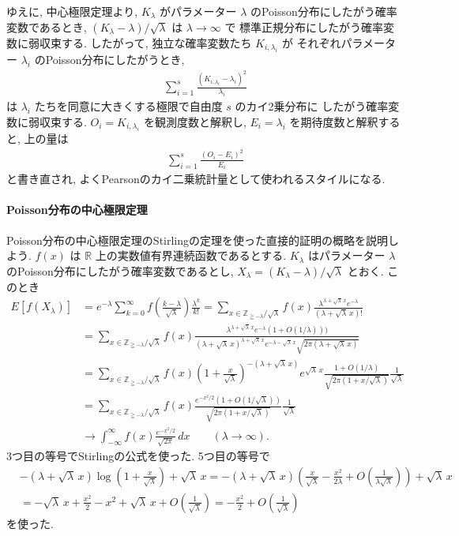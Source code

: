 \documentclass[12pt,twoside]{jarticle}
\newcommand\Z{{\mathbb Z}} %
\newcommand\R{{\mathbb R}} %
\theoremstyle{jplain}
\theoremstyle{jplain}
\theoremstyle{jplain}
\numberwithin{theorem}{section}
\numberwithin{equation}{section}
\numberwithin{figure}{section}
\numberwithin{table}{section}
\begin{document}
ゆえに, 中心極限定理より,
$K_\lambda$ がパラメーター $\lambda$ のPoisson分布にしたがう確率変数であるとき, $(K_\lambda-\lambda)/\sqrt{\lambda}$ は $\lambda\to\infty$ で
標準正規分布にしたがう確率変数に弱収束する.
したがって, 独立な確率変数たち $K_{i,\lambda_i}$ が
それぞれパラメーター $\lambda_i$ のPoisson分布にしたがうとき,
\begin{align*}
\sum_{i=1}^s \frac{(K_{i,\lambda_i}-\lambda_i)^2}{\lambda_i}
\end{align*}
は $\lambda_i$ たちを同意に大きくする極限で自由度 $s$ のカイ2乗分布に
したがう確率変数に弱収束する. $O_i=K_{i,\lambda_i}$ を観測度数と解釈し,
$E_i=\lambda_i$ を期待度数と解釈すると, 上の量は
\begin{align*}
\sum_{i=1}^s \frac{(O_i-E_i)^2}{E_i}
\end{align*}
と書き直され, よくPearsonのカイ二乗統計量として使われるスタイルになる.


\paragraph{Poisson分布の中心極限定理}
Poisson分布の中心極限定理のStirlingの定理を使った直接的証明の概略を説明しよう.
$f(x)$ は $\R$ 上の実数値有界連続函数であるとする.
$K_\lambda$ はパラメーター $\lambda$ のPoisson分布にしたがう確率変数であるとし,
$X_\lambda=(K_\lambda-\lambda)/\sqrt{\lambda}$ とおく.
このとき
\begin{align*}
E[f(X_\lambda)]
&
=e^{-\lambda}\sum_{k=0}^\infty
f\left(\frac{k-\lambda}{\sqrt{\lambda}}\right)\frac{\lambda^k}{k!}
=\sum_{x\in\Z_{\geqq-\lambda}/\sqrt{\lambda}}
f(x)\frac{\lambda^{\lambda+\sqrt{\lambda}\,x}e^{-\lambda}}{(\lambda+\sqrt{\lambda}\,x)!}
\\ &
=\sum_{x\in\Z_{\geqq-\lambda}/\sqrt{\lambda}}
f(x)
\frac
{\lambda^{\lambda+\sqrt{\lambda}\,x}e^{-\lambda}(1+O(1/\lambda)))}{(\lambda+\sqrt{\lambda}\,x)^{\lambda+\sqrt{\lambda}\,x}
e^{-\lambda-\sqrt{\lambda}\,x}
\sqrt{2\pi(\lambda+\sqrt{\lambda}\,x)}}
\\ &
=\sum_{x\in\Z_{\geqq-\lambda}/\sqrt{\lambda}}
f(x)
\left(1+\frac{x}{\sqrt{\lambda}}\right)^{-(\lambda+\sqrt{\lambda}\,x)} e^{\sqrt{\lambda}\,x}
\frac{1+O(1/\lambda)}{\sqrt{2\pi(1+x/\sqrt{\lambda})}}\frac{1}{\sqrt{\lambda}}
\\ &
=\sum_{x\in\Z_{\geqq-\lambda}/\sqrt{\lambda}}
f(x)
\frac{e^{-x^2/2}(1+O(1/\sqrt{\lambda}))}{\sqrt{2\pi(1+x/\sqrt{\lambda})}}\frac{1}{\sqrt{\lambda}}
\\ &
\longrightarrow
\int_{-\infty}^\infty f(x)\frac{e^{-x^2/2}}{\sqrt{2\pi}}\,dx
\qquad (\lambda\to\infty).
\end{align*}
3つ目の等号でStirlingの公式を使った.
5つ目の等号で
\begin{align*}
&
-(\lambda+\sqrt{\lambda}\,x)\log\left(1+\frac{x}{\sqrt{\lambda}}\right)+\sqrt{\lambda}\,x
=-(\lambda+\sqrt{\lambda}\,x)
\left(
 \frac{x}{\sqrt{\lambda}}-\frac{x^2}{2\lambda}+O\left(\frac{1}{\lambda\sqrt{\lambda}}\right)
\right)
+\sqrt{\lambda}\,x
\\ &
=-\sqrt{\lambda}\,x+\frac{x^2}{2}-x^2+\sqrt{\lambda}\,x
+O\left(\frac{1}{\sqrt{\lambda}}\right)
=-\frac{x^2}{2}
+O\left(\frac{1}{\sqrt{\lambda}}\right)
\end{align*}
を使った.
\end{document}
